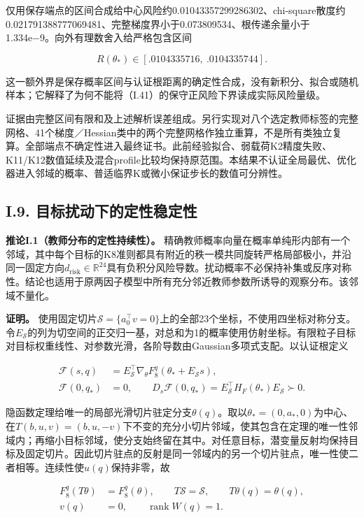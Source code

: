 \documentclass[11pt,a4paper]{article}
\begin{document}
仅用保存端点的区间合成给中心风险约0.01043357299286302、chi-square散度约0.021791388777069481、完整梯度界小于0.073809534、根传递余量小于1.334e−9。向外有理数舍入给严格包含区间

\[
R(\theta_*)\in[.0104335716,\ .0104335744].
\tag{I.43}
\]

这一额外界是保存概率区间与认证根距离的确定性合成，没有新积分、拟合或随机样本；它解释了为何不能将（I.41）的保守正风险下界读成实际风险量级。

证据由完整区间有限和及上述解析误差组成。另行实现对八个选定教师标签的完整网格、41个梯度／Hessian类中的两个完整网格作独立重算，不是所有类独立复算。全部端点不确定性进入最终证书。此前经验拟合、弱载荷K2精度失败、K11/K12数值延续及混合profile比较均保持原范围。本结果不认证全局最优、优化器进入邻域的概率、普适临界K或微小保证步长的数值可分辨性。

\subsection*{I.9. 目标扰动下的定性稳定性}\label{local-persistence}

\textbf{推论I.1（教师分布的定性持续性）。}
精确教师概率向量在概率单纯形内部有一个邻域，其中每个目标的K8准则都具有附近的秩一模共同旋转严格局部极小，并沿同一固定方向\(d_{\mathrm{risk}}\in\mathbb R^{24}\)具有负积分风险导数。扰动概率不必保持补集或反序对称性。结论也适用于原两因子模型中所有充分邻近教师参数所诱导的观察分布。该邻域不量化。

\textbf{证明。}
使用固定切片\(\mathcal S=\{a_0^\top v=0\}\)上的全部23个坐标，不使用四坐标对称分支。令\(E_{\mathcal S}\)的列为切空间的正交归一基，对总和为1的概率使用仿射坐标。有限粒子目标对目标权重线性、对参数光滑，各阶导数由Gaussian多项式支配。以认证根定义

\[
\begin{aligned}
\mathcal F(s,q)&=E_{\mathcal S}^\top\nabla_\theta F_8^q(\theta_*+E_{\mathcal S}s),\\
\mathcal F(0,q_*)&=0,\qquad
D_s\mathcal F(0,q_*)=E_{\mathcal S}^\top H_F(\theta_*)E_{\mathcal S}\succ0.
\end{aligned}
\tag{I.44}
\]

隐函数定理给唯一的局部光滑切片驻定分支\(\theta(q)\)。取以\(\theta_*=(0,a_*,0)\)为中心、在\(T(b,u,v)=(b,u,-v)\)下不变的充分小切片邻域，使其包含在定理的唯一性邻域内；再缩小目标邻域，使分支始终留在其中。对任意目标，潜变量反射均保持目标及固定切片。因此切片驻点的反射是同一邻域内的另一个切片驻点，唯一性使二者相等。连续性使\(u(q)\)保持非零，故

\[
\begin{aligned}
F_8^q(T\theta)&=F_8^q(\theta),\qquad T\mathcal S=\mathcal S,\qquad T\theta(q)=\theta(q),\\
v(q)&=0,\qquad \operatorname{rank}W(q)=1.
\end{aligned}
\]
\end{document}
